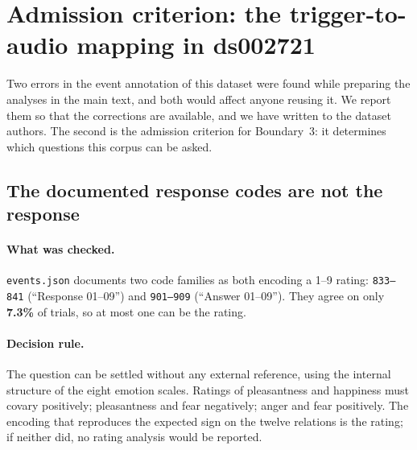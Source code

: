 \clearpage
\section{Admission criterion: the trigger-to-audio mapping in ds002721}

Two errors in the event annotation of this dataset were found while preparing the
analyses in the main text, and both would affect anyone reusing it. We report them so
that the corrections are available, and we have written to the dataset authors. The
second is the admission criterion for Boundary~3: it determines which questions this
corpus can be asked.

\subsection{The documented response codes are not the response}

\paragraph{What was checked.}
\texttt{events.json} documents two code families as both encoding a 1--9 rating:
\texttt{833--841} (``Response 01--09'') and \texttt{901--909} (``Answer 01--09'').
They agree on only \textbf{7.3\%} of trials, so at most one can be the rating.

\paragraph{Decision rule.}
The question can be settled without any external reference, using the internal
structure of the eight emotion scales. Ratings of pleasantness and happiness must
covary positively; pleasantness and fear negatively; anger and fear positively. The
encoding that reproduces the expected sign on the twelve relations is the rating; if
neither did, no rating analysis would be reported.

